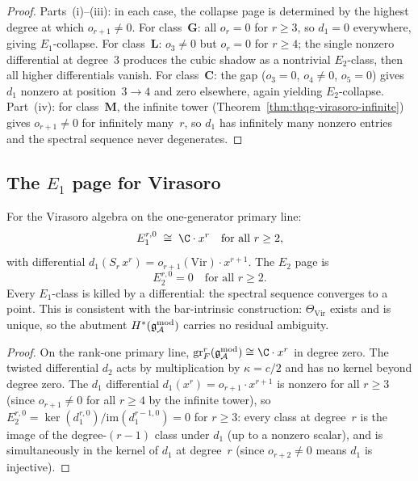 \begin{proof}
Parts~(i)--(iii): in each case, the collapse page is
determined by the highest degree at which $o_{r+1} \neq 0$.
For class~$\mathbf{G}$: all $o_r = 0$ for $r \geq 3$,
so $d_1 = 0$ everywhere, giving $E_1$-collapse.
For class~$\mathbf{L}$: $o_3 \neq 0$ but $o_r = 0$ for
$r \geq 4$; the single nonzero differential at degree~$3$
produces the cubic shadow as a nontrivial $E_2$-class,
then all higher differentials vanish.
For class~$\mathbf{C}$: the gap ($o_3 = 0$, $o_4 \neq 0$,
$o_5 = 0$) gives $d_1$ nonzero at position~$3 \to 4$ and
zero elsewhere, again yielding $E_2$-collapse.
Part~(iv): for class~$\mathbf{M}$, the infinite tower
(Theorem~\ref{thm:thqg-virasoro-infinite}) gives
$o_{r+1} \neq 0$ for infinitely many~$r$, so $d_1$ has
infinitely many nonzero entries and the spectral sequence
never degenerates.
\end{proof}



\subsection{The $E_1$ page for Virasoro}
\label{subsec:thqg-e1-virasoro}

\begin{proposition}
\label{prop:thqg-e1-virasoro}
\ClaimStatusProvedHere
For the Virasoro algebra on the one-generator primary line:
\begin{equation}\label{eq:thqg-e1-virasoro}
E_1^{r,0}
\;\cong\;
\C\cdot x^r
\quad\text{for all } r \geq 2,
\end{equation}
with differential $d_1(S_r\,x^r) = o_{r+1}(\mathrm{Vir})
\cdot x^{r+1}$. The $E_2$ page is
\begin{equation}\label{eq:thqg-e2-virasoro}
E_2^{r,0} = 0
\quad\text{for all } r \geq 2.
\end{equation}
Every $E_1$-class is killed by a differential: the spectral
sequence converges to a point. This is consistent with the
bar-intrinsic construction: $\Theta_{\mathrm{Vir}}$ exists
and is unique, so the abutment $H^*(\mathfrak{g}_{\mathcal{A}}^{\mathrm{mod}})$ carries no
residual ambiguity.
\end{proposition}

\begin{proof}
On the rank-one primary line,
$\operatorname{gr}^r_F(\gAmod) \cong \C\cdot x^r$ in
degree zero. The twisted differential $d_2$ acts by
multiplication by $\kappa = c/2$ and has no kernel beyond
degree zero. The $d_1$ differential
$d_1(x^r) = o_{r+1}\cdot x^{r+1}$ is nonzero for all
$r \geq 3$ (since $o_{r+1} \neq 0$ for all $r \geq 4$
by the infinite tower), so
$E_2^{r,0} = \ker(d_1^{r,0})/\mathrm{im}(d_1^{r-1,0}) = 0$
for $r \geq 3$: every class at degree~$r$ is the image of
the degree-$(r{-}1)$ class under $d_1$ (up to a nonzero
scalar), and is simultaneously in the kernel of $d_1$ at
degree~$r$ (since $o_{r+2} \neq 0$ means $d_1$ is injective).
\end{proof}


